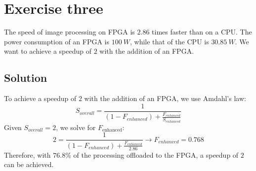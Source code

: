 \section{Exercise three}

The speed of image processing on FPGA is $2.86$ times faster than on a CPU.\@
The power consumption of an FPGA is $100\:W$, while that of the CPU is $30.85\:W$.
We want to achieve a speedup of $2$ with the addition of an FPGA.\@

\subsection*{Solution}
To achieve a speedup of $2$ with the addition of an FPGA, we use Amdahl's law:
\[S_{overall}=\dfrac{1}{\left(1-F_{enhanced}\right)+\frac{F_{enhanced}}{S_{enhanced}}}\]
Given $S_{overall} = 2$, we solve for $F_{\text{enhanced}}$:
\[2=\dfrac{1}{\left(1-F_{enhanced}\right)+\frac{F_{enhanced}}{2.86}}\rightarrow F_{enhanced}=0.768\]
Therefore, with $76.8\%$ of the processing offloaded to the FPGA, a speedup of $2$ can be achieved.